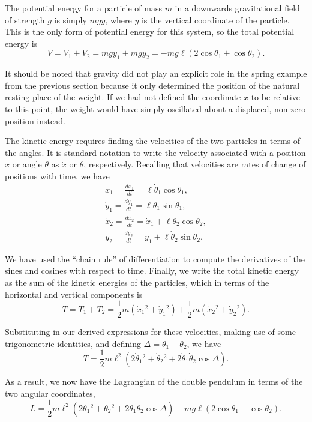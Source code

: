 \documentclass[11pt]{article}
\begin{document}
The potential energy for a particle of mass $m$ in a downwards gravitational field of strength $g$ is simply $mgy$, where $y$ is the vertical coordinate of the particle. This is the only form of potential energy for this system, so the total potential energy is
$$V=V_1+V_2=mgy_1+mgy_2=-mg\ell\left(2\cos\theta_1+\cos\theta_2\right).$$

It should be noted that gravity did not play an explicit role in the spring example from the previous section because it only determined the position of the natural resting place of the weight. If we had not defined the coordinate $x$ to be relative to this point, the weight would have simply oscillated about a displaced, non\hyp{}zero position instead.
\newline

The kinetic energy requires finding the velocities of the two particles in terms of the angles. It is standard notation to write the velocity associated with a position $x$ or angle $\theta$ as $\dot{x}$ or $\dot{\theta}$, respectively. Recalling that velocities are rates of change of positions with time, we have
\begin{gather*}
\dot{x}_1=\frac{dx_1}{dt}=\ell\dot{\theta}_1\cos\theta_1,\\[8pt]
\dot{y}_1=\frac{dy_1}{dt}=\ell\dot{\theta}_1\sin\theta_1,\\[8pt]
\dot{x}_2=\frac{dx_2}{dt}=\dot{x}_1+\ell\dot{\theta}_2\cos\theta_2,\\[8pt]
\dot{y}_2=\frac{dy_2}{dt}=\dot{y}_1+\ell\dot{\theta}_2\sin\theta_2.
\end{gather*}

We have used the ``chain rule'' of differentiation to compute the derivatives of the sines and cosines with respect to time. Finally, we write the total kinetic energy as the sum of the kinetic energies of the particles, which in terms of the horizontal and vertical components is
$$T=T_1+T_2=\frac{1}{2}m\left(\dot{x}_1{}^2+\dot{y}_1{}^2\right)+\frac{1}{2}m\left(\dot{x}_2{}^2+\dot{y}_2{}^2\right).$$
\newpage

Substituting in our derived expressions for these velocities, making use of some trigonometric identities, and defining $\Delta=\theta_1-\theta_2$, we have
$$T=\frac{1}{2}m\ell^2\left(2\dot{\theta}_1{}^2+\dot{\theta}_2{}^2+2\dot{\theta}_1\dot{\theta}_2\cos\Delta\right).$$

As a result, we now have the Lagrangian of the double pendulum in terms of the two angular coordinates,
$$L=\frac{1}{2}m\ell^2\left(2\dot{\theta}_1{}^2+\dot{\theta}_2{}^2+2\dot{\theta}_1\dot{\theta}_2\cos\Delta\right)+mg\ell\left(2\cos\theta_1+\cos\theta_2\right).$$
\end{document}
